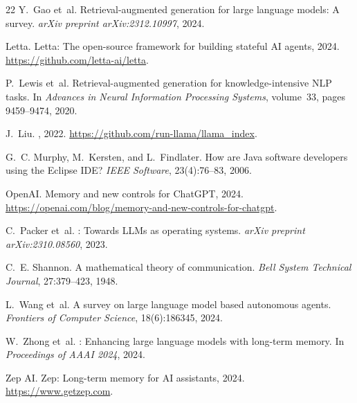 \documentclass[11pt]{article}
\begin{document}
\begin{thebibliography}{22}
Y.~Gao et~al.
\newblock Retrieval-augmented generation for large language models: A survey.
\newblock \emph{arXiv preprint arXiv:2312.10997}, 2024.

Letta.
\newblock Letta: The open-source framework for building stateful {AI} agents, 2024.
\newblock \url{https://github.com/letta-ai/letta}.

P.~Lewis et~al.
\newblock Retrieval-augmented generation for knowledge-intensive {NLP} tasks.
\newblock In \emph{Advances in Neural Information Processing Systems}, volume~33, pages 9459--9474, 2020.

J.~Liu.
, 2022.
\newblock \url{https://github.com/run-llama/llama_index}.

G.~C. Murphy, M.~Kersten, and L.~Findlater.
\newblock How are {J}ava software developers using the {E}clipse {IDE}?
\newblock \emph{IEEE Software}, 23(4):76--83, 2006.

OpenAI.
\newblock Memory and new controls for {ChatGPT}, 2024.
\newblock \url{https://openai.com/blog/memory-and-new-controls-for-chatgpt}.

C.~Packer et~al.
: Towards {LLMs} as operating systems.
\newblock \emph{arXiv preprint arXiv:2310.08560}, 2023.

C.~E. Shannon.
\newblock A mathematical theory of communication.
\newblock \emph{Bell System Technical Journal}, 27:379--423, 1948.

L.~Wang et~al.
\newblock A survey on large language model based autonomous agents.
\newblock \emph{Frontiers of Computer Science}, 18(6):186345, 2024.

W.~Zhong et~al.
: Enhancing large language models with long-term memory.
\newblock In \emph{Proceedings of AAAI 2024}, 2024.

{Zep AI}.
\newblock Zep: Long-term memory for {AI} assistants, 2024.
\newblock \url{https://www.getzep.com}.

\end{thebibliography}

\appendix
\end{document}
